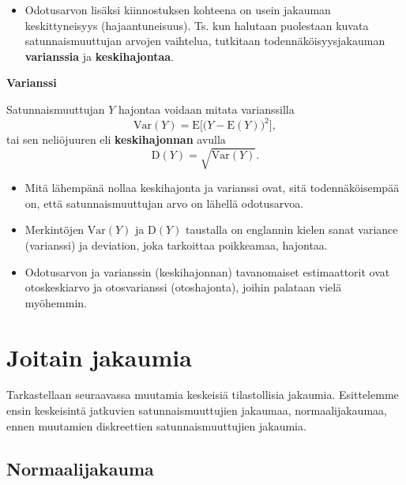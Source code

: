 \documentclass[
]{book}
\providecommand{\tightlist}{%
  \setlength{\itemsep}{0pt}\setlength{\parskip}{0pt}}
\begin{document}
\hfill\break

\begin{itemize}
\tightlist
\item
  Odotusarvon lisäksi kiinnostuksen kohteena on usein jakauman keskittyneisyys (hajaantuneisuus). Ts. kun halutaan puolestaan kuvata satunnaismuuttujan arvojen vaihtelua, tutkitaan todennäköisyysjakauman \textbf{varianssia} ja \textbf{keskihajontaa}.
\end{itemize}

\begin{defblock}{}

\textbf{Varianssi}

Satunnaismuuttujan \(Y\) hajontaa voidaan mitata varianssilla
\[
\mathrm{Var}(Y) = \text{E}\Big[\Big(Y-\text{E}(Y)\Big)^2\Big],
\]
tai sen neliöjuuren eli \textbf{keskihajonnan} avulla
\[
\text{D}(Y) = \sqrt{\mathrm{Var}(Y)}.
\]

\begin{itemize}
\tightlist
\item
  Mitä lähempänä nollaa keskihajonta ja varianssi ovat, sitä todennäköisempää on, että satunnaismuuttujan arvo on lähellä odotusarvoa.
\item
  Merkintöjen \(\mathrm{Var}(Y)\) ja \(\text{D}(Y)\) taustalla on englannin kielen sanat variance (varianssi) ja deviation, joka tarkoittaa poikkeamaa, hajontaa.
\end{itemize}

\end{defblock}

\begin{itemize}
\tightlist
\item
  Odotusarvon ja varianssin (keskihajonnan) tavanomaiset estimaattorit ovat otoskeskiarvo ja otosvarianssi (otoshajonta), joihin palataan vielä myöhemmin.
\end{itemize}

\hypertarget{alaluku45}{%
\section{Joitain jakaumia}\label{alaluku45}}

Tarkastellaan seuraavassa muutamia keskeisiä tilastollisia jakaumia. Esittelemme ensin keskeisintä jatkuvien satunnaismuuttujien jakaumaa, normaalijakaumaa, ennen muutamien diskreettien satunnaismuuttujien jakaumia.

\hypertarget{normaalijakauma}{%
\subsection{Normaalijakauma}\label{normaalijakauma}}
\end{document}
